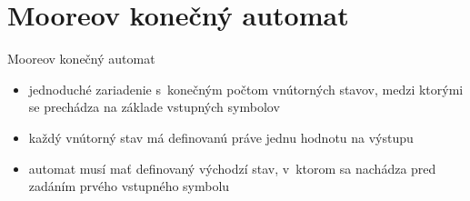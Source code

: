 \documentclass[hyperref={unicode}]{beamer}
\begin{document}
\section{Mooreov konečný automat}
\begin{block}{Mooreov konečný automat}
\transwipe
\begin{itemize}
\item jednoduché zariadenie s~konečným počtom vnútorných stavov, medzi ktorými se prechádza na základe vstupných symbolov
\item každý vnútorný stav má definovanú práve jednu hodnotu na výstupu
\item automat musí mať definovaný východzí stav, v~ktorom sa nachádza pred zadáním prvého vstupného symbolu
\end{itemize}
\end{block}
\begin{figure}[h]
\centering
{}
\end{figure}
\end{document}
